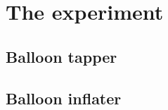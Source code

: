 \section*{The experiment}
\lipsum[7-9]

\subsection*{Balloon tapper}
\lipsum[7-15]

\subsection*{Balloon inflater}
\lipsum[7-15]